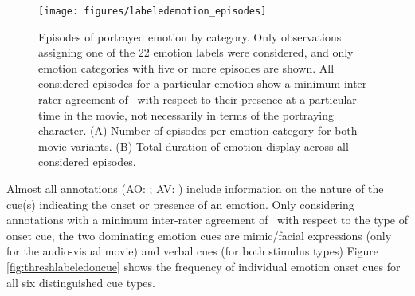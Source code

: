 \begin{figure}
  \centering
  \texttt{[image: figures/labeledemotion\_episodes]}
  \caption{Episodes of portrayed emotion by category. Only observations assigning
    one of the 22 emotion labels were considered, and only emotion categories
    with five or more episodes are shown. All considered episodes for a particular emotion
    show a minimum inter-rater agreement of \AVAggThresh\ with respect to their
    presence at a particular time in the movie, not necessarily in terms of the
    portraying character. (A) Number of episodes
    per emotion category for both movie variants. (B) Total duration of emotion
    display across all considered episodes.}
  \label{fig:threshlabeledemotion}
\end{figure}

Almost all annotations (AO: \AOFracWithLabeledOncue; AV:
\AVFracWithLabeledOncue) include information on the nature of the cue(s)
indicating the onset or presence of an emotion. Only considering annotations
with a minimum inter-rater agreement of \AVAggThresh\ with respect to the type
of onset cue, the two dominating emotion cues are mimic/facial expressions
(only for the audio-visual movie) and verbal cues (for both stimulus types)
Figure \ref{fig:threshlabeledoncue} shows the frequency of individual emotion
onset cues for all six distinguished cue types.


